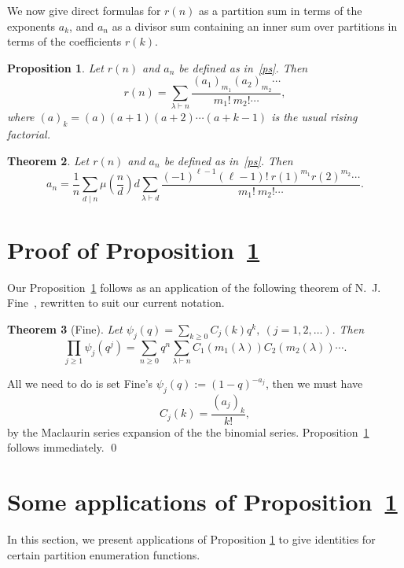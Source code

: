 \documentclass[10pt]{article}
\newtheorem{theorem}{Theorem}
\newtheorem{proposition}[theorem]{Proposition}
\theoremstyle{definition}
\numberwithin{theorem}{section}
\numberwithin{equation}{section}
\begin{document}
We now give direct formulas for $r(n)$ as a partition sum
in terms of  the exponents $a_k$, and $a_n$ as a divisor sum containing an inner sum over partitions in terms 
of the coefficients $r(k)$.

\begin{proposition} \label{thm1}
Let $r(n)$ and $a_n$ be defined as in~\eqref{ps}.  Then
\begin{equation} \label{RfromA} r(n) = \sum_{\lambda \vdash n}
  \frac{  (a_1)_{m_1} (a_2)_{m_2} \cdots }
  {m_1!\  m_2! \cdots},
 \end{equation}
 where 
 $(a)_k = (a)(a+1)(a+2)\cdots(a+k-1)$ is the usual rising factorial.  
 \end{proposition}
  
  \begin{theorem} \label{thm2}
  Let $r(n)$ and $a_n$ be defined as in~\eqref{ps}.  Then
  \begin{equation}  a_n = \frac{1}{n} \sum_{d\mid n} \mu\left( \frac{n}{d} \right) d
             \sum_{\lambda\vdash d}   
             \frac{ (-1)^{\ell - 1} (\ell-1)! \ r(1)^{m_1}  r(2)^{m_2}\cdots } 
             {  m_1!\  m_2!  \cdots } . 
     \label{AfromR}
  \end{equation}   
  
  \end{theorem}
  
  \section{Proof of Proposition~\ref{thm1}}
  Our Proposition~\ref{thm1} follows as an application of the following theorem
  of N.~J. Fine~\cite[\S22, Theorem 1]{f88}, rewritten to suit our current notation.
  \begin{theorem}[Fine]
  Let $\psi_j(q) = \sum_{k\geq 0} C_j(k) q^k,\  (j = 1,2,\dots). $ Then
  \[ \prod_{j\geq 1} \psi_j(q^j) = \sum_{n\geq 0} q^n \sum_{\lambda\vdash n}
  C_1(m_1(\lambda) ) C_2(m_2(\lambda)) \cdots .\]
  \end{theorem}
  
  All we need to do is set Fine's $\psi_j(q) := (1-q)^{-a_j}$, then 
we must have \[ C_j(k) = \frac{(a_j)_k}{k!}, \] by the Maclaurin series 
expansion of the the binomial series.   Proposition~\ref{thm1} follows immediately. \qed


\section{Some applications of Proposition~\ref{thm1}}
In this section, we present applications of Proposition \ref{thm1} to give identities for certain partition enumeration functions. 
\end{document}
